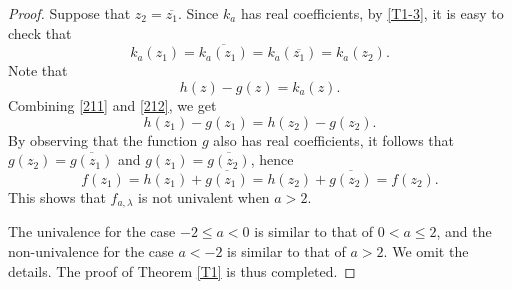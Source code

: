 \documentclass[11pt, reqno]{amsart}
\numberwithin{equation}{section}
\begin{document}
\begin{proof}
 Suppose that $z_2=\overline{z_1}$. Since $k_a$ has real coefficients, by \eqref{T1-3}, it is easy to check that
   \begin{equation}\label{211}
       k_a(z_1)=\overline {k_a(z_1)}=k_a(\overline{z_1})=k_a(z_2).
   \end{equation}
   Note that  \begin{equation}\label{212}h(z)-g(z)=k_a(z).\end{equation}
Combining \eqref{211} and \eqref{212}, we get
    $$h(z_1)-g(z_1)=h(z_2)-g(z_2).$$ 
    By observing that the function $g$ also has real coefficients, it follows that  $g(z_2)=\overline{g(z_1)}$  
   and $g(z_1)=\overline{g(z_2)}$, hence $$f(z_1)=h(z_1)+\overline{g(z_1)}=h(z_2)+\overline{g(z_2)}=f(z_2).$$ This shows that $f_{a,\lambda}$ is not univalent when $a>2$. 

    The univalence for the case $-2\leq a<0$ is similar to that of $0<a\leq2$, and the non-univalence for the case 
    $a<-2$ is similar to that of $a>2$.
    We omit the details.
    The proof of Theorem \ref{T1} is thus completed.
\end{proof}  
\end{document}
